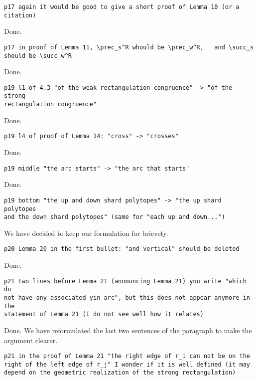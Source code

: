 \documentclass{article}
\begin{document}
\begin{verbatim}
p17 again it would be good to give a short proof of Lemma 10 (or a citation)
\end{verbatim}

Done.

\begin{verbatim}
p17 in proof of Lemma 11, \prec_s^R whould be \prec_w^R,   and \succ_s 
should be \succ_w^R
\end{verbatim}

Done.

\begin{verbatim}
p19 l1 of 4.3 "of the weak rectangulation congruence" -> "of the strong 
rectangulation congruence"
\end{verbatim}

Done.

\begin{verbatim}
p19 l4 of proof of Lemma 14: "cross" -> "crosses"
\end{verbatim}

Done.

\begin{verbatim}
p19 middle "the arc starts" -> "the arc that starts"
\end{verbatim}

Done.

\begin{verbatim}
p19 bottom "the up and down shard polytopes" -> "the up shard polytopes 
and the down shard polytopes" (same for "each up and down...")
\end{verbatim}

We have decided to keep our formulation for brievety.

\begin{verbatim}
p20 Lemma 20 in the first bullet: "and vertical" should be deleted
\end{verbatim}

Done.

\begin{verbatim}
p21 two lines before Lemma 21 (announcing Lemma 21) you write "which do 
not have any associated yin arc", but this does not appear anymore in the 
statement of Lemma 21 (I do not see well how it relates)
\end{verbatim}

Done. We have reformulated the last two sentences of the paragraph to make the argument clearer.

\begin{verbatim}
p21 in the proof of Lemma 21 "the right edge of r_i can not be on the 
right of the left edge of r_j" I wonder if it is well defined (it may 
depend on the geometric realization of the strong rectangulation)
\end{verbatim}
\end{document}
